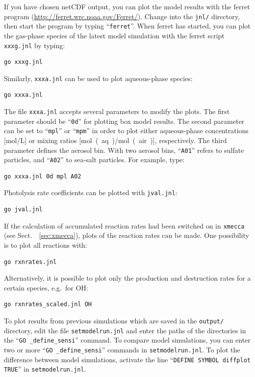 \documentclass[twoside]{article}
\begin{document}
If you have chosen netCDF output, you can plot the model results with
the ferret program (\url{http://ferret.wrc.noaa.gov/Ferret/}). Change
into the \verb|jnl/| directory, then start the program by typing
``\verb|ferret|''. When ferret has started, you can plot the gas-phase
species of the latest model simulation with the ferret script
\verb|xxxg.jnl| by typing:
\begin{verbatim}
go xxxg.jnl
\end{verbatim}
Similarly, \verb|xxxa.jnl| can be used to plot aqueous-phase species:
\begin{verbatim}
go xxxa.jnl
\end{verbatim}
The file \verb|xxxa.jnl| accepts several parameters to modify the plots.
The first parameter should be ``\verb|0d|'' for plotting box model
results. The second parameter can be set to ``\verb|mpl|'' or
``\verb|mpm|'' in order to plot either aqueous-phase concentrations
[\unit{mol/L}] or mixing ratios [\unit{mol(aq)/mol(air)}], respectively.
The third parameter defines the aerosol bin. With two aerosol bins,
``\verb|A01|'' refers to sulfate particles, and ``\verb|A02|'' to
sea-salt particles. For example, type:
\begin{verbatim}
go xxxa.jnl 0d mpl A02
\end{verbatim}
Photolysis rate coefficients can be plotted with \verb|jval.jnl|:
\begin{verbatim}
go jval.jnl
\end{verbatim}
If the calculation of accumulated reaction rates had been switched on in
\verb|xmecca| (see Sect.~~\ref{sec:xmecca}), plots of the reaction rates
can be made. One possibility is to plot all reactions with:
\begin{verbatim}
go rxnrates.jnl
\end{verbatim}
Alternatively, it is possible to plot only the production and
destruction rates for a certain species, e.g.\ for OH:
\begin{verbatim}
go rxnrates_scaled.jnl OH
\end{verbatim}
To plot results from previous simulations which are saved in the
\verb|output/| directory, edit the file \verb|setmodelrun.jnl| and enter
the paths of the directories in the ``\verb|GO _define_sensi|'' command.
To compare model simulations, you can enter two or more
``\verb|GO _define_sensi|'' commands in \verb|setmodelrun.jnl|. To plot
the difference between model simulations, activate the line
``\verb|DEFINE SYMBOL diffplot TRUE|'' in \verb|setmodelrun.jnl|.
\end{document}
